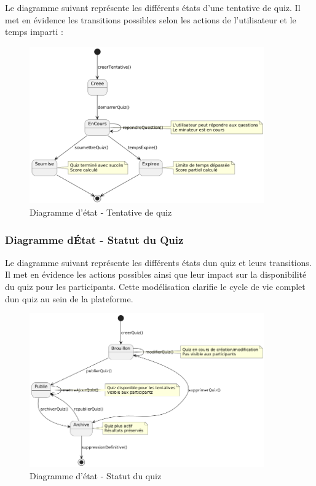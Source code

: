 \documentclass[12pt,a4paper,twoside]{report}
\begin{document}
Le diagramme suivant représente les différents états d'une tentative de
quiz. Il met en évidence les transitions possibles selon les actions de
l'utilisateur et le temps imparti :

\begin{figure}[H]
\centering
\includegraphics[width=0.9\textwidth]{latex_media/media/image21.png}
\caption{Diagramme d'état - Tentative de quiz}
\label{fig:diagramme-etat-tentative}
\end{figure}

\hypertarget{diagramme-duxe9tat---statut-du-quiz}{%
\subsubsection{Diagramme d\textquotesingle État - Statut du
Quiz}\label{diagramme-duxe9tat---statut-du-quiz}}

Le diagramme suivant représente les différents états
d\textquotesingle un quiz et leurs transitions. Il met en évidence les
actions possibles ainsi que leur impact sur la disponibilité du quiz
pour les participants. Cette modélisation clarifie le cycle de vie
complet d\textquotesingle un quiz au sein de la plateforme.

\begin{figure}[H]
\centering
\includegraphics[width=0.9\textwidth]{latex_media/media/image22.png}
\caption{Diagramme d'état - Statut du quiz}
\label{fig:diagramme-etat-quiz}
\end{figure}
\end{document}
